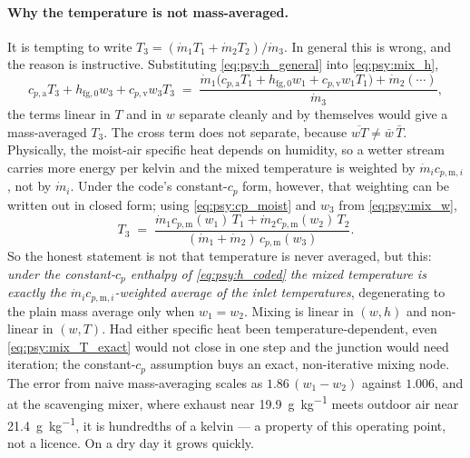 \documentclass[11pt]{article}
\newcommand{\md}{\ensuremath{\dot m}}
\begin{document}
\paragraph{Why the temperature is not mass-averaged.}
It is tempting to write $T_3 = (\md_1 T_1 + \md_2 T_2)/\md_3$. In general this is wrong, and the
reason is instructive. Substituting \eqref{eq:psy:h_general} into \eqref{eq:psy:mix_h},
\begin{equation*}
c_{p,\mathrm{a}} T_3 + h_{\mathrm{fg},0} w_3 + c_{p,\mathrm{v}} w_3 T_3
\;=\; \frac{\md_1\bigl(c_{p,\mathrm{a}} T_1 + h_{\mathrm{fg},0} w_1
+ c_{p,\mathrm{v}} w_1 T_1\bigr) + \md_2(\cdots)}{\md_3} ,
\end{equation*}
the terms linear in $T$ and in $w$ separate cleanly and by themselves would give a mass-averaged
$T_3$. The cross term does not separate, because $\overline{wT} \neq \bar{w}\,\bar{T}$. Physically,
the moist-air specific heat depends on humidity, so a wetter stream carries more energy per kelvin
and the mixed temperature is weighted by $\md_i c_{p,\mathrm{m},i}$, not by $\md_i$. Under the
code's constant-$c_p$ form, however, that weighting can be written out in closed form; using
\eqref{eq:psy:cp_moist} and $w_3$ from \eqref{eq:psy:mix_w},
\begin{equation}
T_3 \;=\; \frac{\md_1 c_{p,\mathrm{m}}(w_1)\,T_1 + \md_2 c_{p,\mathrm{m}}(w_2)\,T_2}
{(\md_1 + \md_2)\,c_{p,\mathrm{m}}(w_3)} . \label{eq:psy:mix_T_exact}
\end{equation}
So the honest statement is not that temperature is never averaged, but this: \emph{under the
constant-$c_p$ enthalpy of \eqref{eq:psy:h_coded} the mixed temperature is exactly the $\md_i
c_{p,\mathrm{m},i}$-weighted average of the inlet temperatures}, degenerating to the plain mass
average only when $w_1 = w_2$. Mixing is linear in $(w,h)$ and non-linear in $(w,T)$. Had either
specific heat been temperature-dependent, even \eqref{eq:psy:mix_T_exact} would not close in one
step and the junction would need iteration; the constant-$c_p$ assumption buys an exact,
non-iterative mixing node. The error from naive mass-averaging scales as $1.86\,(w_1-w_2)$ against
$1.006$, and at the scavenging mixer, where exhaust near \SI{19.9}{\gram\per\kilogram} meets outdoor
air near \SI{21.4}{\gram\per\kilogram}, it is hundredths of a kelvin --- a property of this
operating point, not a licence. On a dry day it grows quickly.
\end{document}
